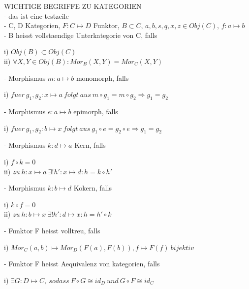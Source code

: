 \documentclass[12pt]{article}
\begin{document}
 WICHTIGE BEGRIFFE ZU KATEGORIEN\\

- das ist eine testzeile \\
- C, D Kategorien, $F : C \mapsto D$ Funktor, $B \subset C$, $a,b,s,q,x,z \in Obj(C)$, $f : a \mapsto b$ \\
\newline
- B heisst vollstaendige Unterkategorie von C, falls
\begin{description}
    \item[i) $Obj(B) \subset Obj(C)$]
    \item[ii) $\forall X,Y \in Obj(B): Mor_B(X,Y) = Mor_C(X,Y)$]  
\end{description}
- Morphismus $m : a \mapsto b$ monomorph, falls
\begin{description}
    \item[i) $fuer \: g_1,g_2 : x \mapsto a \: folgt \: aus \: m \circ g_1 = m \circ g_2 \Rightarrow g_1 = g_2$] 
\end{description}
- Morphismus $e : a \mapsto b$ epimorph, falls
\begin{description}
    \item[i) $fuer \: g_1,g_2 : b \mapsto x \: folgt \: aus \: g_1 \circ e = g_2 \circ e \Rightarrow g_1 = g_2$] 
\end{description}
- Morphismus $k : d \mapsto a$ Kern, falls
\begin{description}
    \item[i) $f \circ k = 0$]
    \item[ii) $zu \: h : x \mapsto a \: \exists ! h' : x \mapsto d: h = k \circ h'$] 
\end{description}
- Morphismus $k : b \mapsto d$ Kokern, falls
\begin{description}
    \item[i) $k \circ f = 0$]
    \item[ii) $zu \: h : b \mapsto x \: \exists ! h' : d \mapsto x: h = h' \circ k$] 
\end{description}
- Funktor F heisst volltreu, falls 
\begin{description}
    \item[i) $Mor_C(a,b) \mapsto Mor_D(F(a),F(b)), f \mapsto F(f) \: bijektiv$] 
\end{description}
- Funktor F heisst Aequivalenz von kategorien, falls
\begin{description}
    \item[i) $\exists G : D \mapsto C, \: sodass \: F \circ G \cong id_D \: und \: G \circ F \cong id_C$] 
\end{description}
\end{document}
